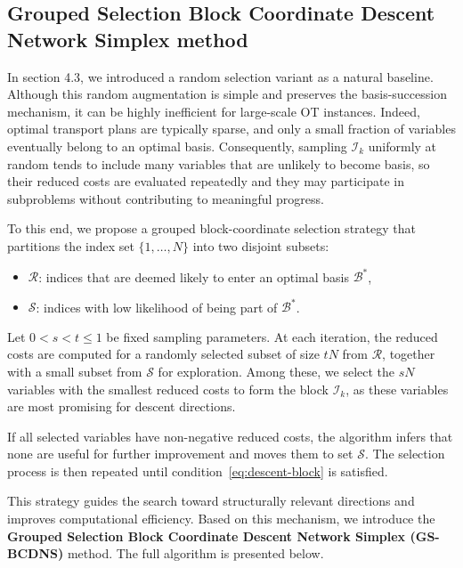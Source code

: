 \documentclass[12pt,a4paper]{article}
\begin{document}
\subsection{Grouped Selection Block Coordinate Descent Network Simplex method}

In section 4.3, we introduced a random selection variant as a natural baseline. Although this random augmentation is simple and preserves the basis-succession mechanism, it can be highly inefficient for large-scale OT instances. Indeed, optimal transport plans are typically sparse, and only a small fraction of variables eventually belong to an optimal basis. Consequently, sampling $\mathcal{I}_k$ uniformly at random tends to include many variables that are unlikely to become basis, so their reduced costs are evaluated repeatedly and they may participate in subproblems without contributing to meaningful progress.

To this end, we propose a grouped block-coordinate selection strategy that partitions the index set $\{1,\dots,N\}$ into two disjoint subsets:
\begin{itemize}
  \item $\mathcal{R}$: indices that are deemed likely to enter an optimal basis $\mathcal{B}^\ast$,
  \item $\mathcal{S}$: indices with low likelihood of being part of $\mathcal{B}^\ast$.
\end{itemize}


Let \(0 < s < t \le 1\) be fixed sampling parameters. At each iteration, the reduced costs are computed for a randomly selected subset of size \(tN\) from \(\mathcal{R}\), together with a small subset from \(\mathcal{S}\) for exploration. Among these, we select the \(sN\) variables with the smallest reduced costs to form the block \(\mathcal{I}_k\), as these variables are most promising for descent directions.

If all selected variables have non-negative reduced costs, the algorithm infers that none are useful for further improvement and moves them to set \(\mathcal{S}\). The selection process is then repeated until condition~\eqref{eq:descent-block} is satisfied.

This strategy guides the search toward structurally relevant directions and improves computational efficiency. Based on this mechanism, we introduce the \textbf{Grouped Selection Block Coordinate Descent Network Simplex (GS-BCDNS)} method. The full algorithm is presented below.
\end{document}
